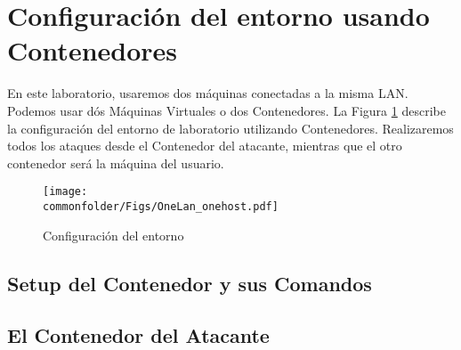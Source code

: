 \section{Configuración del entorno usando Contenedores} 

En este laboratorio, usaremos dos máquinas conectadas a la misma LAN. Podemos usar dós Máquinas Virtuales o dos Contenedores. 
La Figura \ref{fig:labsetup} describe la configuración del entorno de laboratorio utilizando Contenedores.
Realizaremos todos los ataques desde el Contenedor del atacante, mientras que el otro contenedor será la máquina del usuario.

\begin{figure}[htb]
\begin{center}
\texttt{[image: \\commonfolder/Figs/OneLan\_onehost.pdf]}
\end{center}
\caption{Configuración del entorno}
\label{fig:labsetup}
\end{figure}
 

%
 


\subsection{Setup del Contenedor y sus Comandos} 




\subsection{El Contenedor del Atacante}

